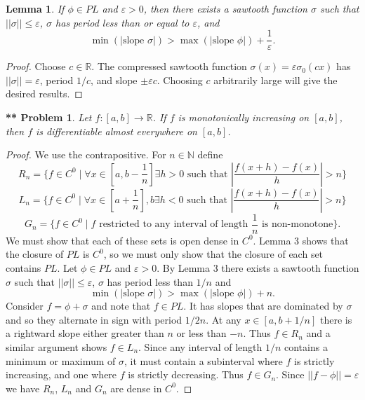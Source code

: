 \documentclass{article}
\newtheorem{**}{** Problem}
\newtheorem{lemma}{Lemma}
\newcommand{\slope}{\text{slope }}
\begin{document}
\begin{flushleft}
\begin{lemma}
If $\phi \in PL$ and $\varepsilon > 0$, then there exists a sawtooth function $\sigma$ such that $||\sigma|| \leq \varepsilon$, $\sigma$ has period less than or equal to $\varepsilon$, and
\[
\min (|\slope \sigma|) > \max (|\slope \phi|) + \frac{1}{\varepsilon}.
\]
\end{lemma}
\begin{proof}
Choose $c \in \mathbb{R}$. The compressed sawtooth function $\sigma (x) = \varepsilon \sigma_0 (cx)$ has $||\sigma|| = \varepsilon$, period $1/c$, and slope $\pm \varepsilon c$. Choosing $c$ arbitrarily large will give the desired results.
\end{proof}

\begin{**}
Let $f : [a, b] \rightarrow \mathbb{R}$. If $f$ is monotonically increasing on $[a,b]$, then $f$ is differentiable almost everywhere on $[a,b]$.
\end{**}
\begin{proof}
We use the contrapositive. For $n \in \mathbb{N}$ define
\[
R_n = \{f \in C^0 \mid \forall x \in [a, b - \frac{1}{n}] \exists h > 0 \text{ such that } \left | \frac{f(x+h) - f(x)}{h} \right | > n\}
\]
\[
L_n = \{f \in C^0 \mid \forall x \in [a + \frac{1}{n}], b \exists h < 0 \text{ such that } \left | \frac{f(x+h) - f(x)}{h} \right | > n\}
\]
\[
G_n = \{f \in C^0 \mid \text{$f$ restricted to any interval of length $\frac{1}{n}$ is non-monotone}\}.
\]
We must show that each of these sets is open dense in $C^0$. Lemma 3 shows that the closure of $PL$ is $C^0$, so we must only show that the closure of each set contains $PL$. Let $\phi \in PL$ and $\varepsilon > 0$. By Lemma 3 there exists a sawtooth function $\sigma$ such that $||\sigma|| \leq \varepsilon$, $\sigma$ has period less than $1/n$ and
\[
\min (|\slope \sigma|) > \max (|\slope \phi|) + n.
\]
Consider $f = \phi + \sigma$ and note that $f \in PL$. It has slopes that are dominated by $\sigma$ and so they alternate in sign with period $1/2n$. At any $x \in [a, b + 1/n]$ there is a rightward slope either greater than $n$ or less than $-n$. Thus $f \in R_n$ and a similar argument shows $f \in L_n$. Since any interval of length $1/n$ contains a minimum or maximum of $\sigma$, it must contain a subinterval where $f$ is strictly increasing, and one where $f$ is strictly decreasing. Thus $f \in G_n$. Since $||f-\phi|| = \varepsilon$ we have $R_n$, $L_n$ and $G_n$ are dense in $C^0$.\newline


\end{proof}
\end{flushleft}
\end{document}
